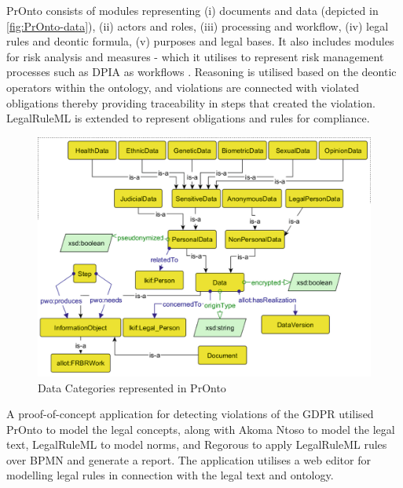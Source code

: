 PrOnto consists of modules representing (i) documents and data
(depicted in \autoref{fig:PrOnto-data}), (ii) actors and roles, (iii)
processing and workflow, (iv) legal rules and deontic formula, (v)
purposes and legal bases. It also includes modules for risk analysis
and measures - which it utilises to represent risk management
processes such as DPIA as workflows
\cite{palmirani_pronto_2018}. Reasoning is utilised based on the
deontic operators within the ontology, and violations are connected
with violated obligations thereby providing traceability in steps that
created the violation. LegalRuleML is extended to represent
obligations and rules for compliance.
\begin{figure}[htbp]
    \centering
    \includegraphics[width=0.8\linewidth]{img/PrOnto_data.png}
    \caption{Data Categories represented in PrOnto \cite{palmirani_pronto_2018}}
    \label{fig:PrOnto-data}
\end{figure}

A proof-of-concept application for detecting violations of the GDPR \cite{monica_modelling_2018} utilised PrOnto to model the legal concepts, along with Akoma Ntoso to model the legal text, LegalRuleML to model norms, and Regorous to apply LegalRuleML rules over BPMN and generate a report. The application utilises a web editor for modelling legal rules in connection with the legal text and ontology.

